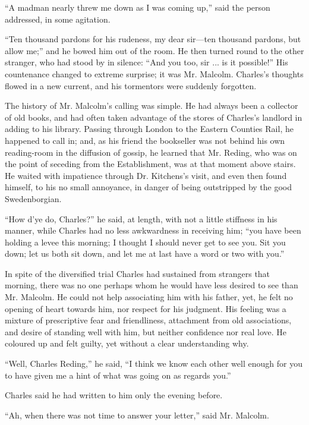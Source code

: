 ``A madman nearly threw me down as I was coming up,'' said
the person addressed, in some agitation.

``Ten thousand pardons for his rudeness, my dear sir—ten
thousand pardons, but allow me;'' and he bowed him out of the
room. He then turned round to the other stranger, who had stood by in
silence: ``And you too, sir ... is it possible!'' His
countenance changed to extreme surprise; it was Mr. Malcolm. Charles's
thoughts flowed in a new current, and his tormentors were suddenly
forgotten.

The history of Mr. Malcolm's calling was simple. He had always been
a collector of old books, and had often taken advantage of the stores
of Charles's landlord in adding to his library. Passing through London
to the Eastern Counties Rail, he happened to call in; and, as his
friend the bookseller was not behind his own reading-room in the
diffusion of gossip, he learned that Mr. Reding, who was on the point
of seceding from the Establishment, was at that moment above stairs.
He waited with impatience through Dr. Kitchens's visit, and even then
found himself, to his no small annoyance, in danger of being
outstripped by the good Swedenborgian.

``How d'ye do, Charles?'' he said, at length, with not a
little stiffness in his manner, while Charles had no less
awkwardness in receiving him; ``you have been holding a levee this
morning; I thought I should never get to see you. Sit you down; let us
both sit down, and let me at last have a word or two with you.''

In spite of the diversified trial Charles had sustained from
strangers that morning, there was no one perhaps whom he would have
less desired to see than Mr. Malcolm. He could not help associating
him with his father, yet, he felt no opening of heart towards him, nor
respect for his judgment. His feeling was a mixture of prescriptive
fear and friendliness, attachment from old associations, and desire of
standing well with him, but neither confidence nor real love. He
coloured up and felt guilty, yet without a clear understanding why.

``Well, Charles Reding,'' he said, ``I think we know
each other well enough for you to have given me a hint of what was
going on as regards you.''

Charles said he had written to him only the evening before.

``Ah, when there was not time to answer your letter,'' said
Mr. Malcolm.

